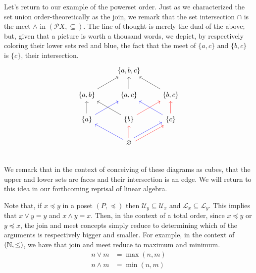 Let's return to our example of the powerset order. Just as we characterized the set union order-theoretically as the join, we remark that the set intersection $\cap$ is the meet $\wedge$ in $(\mathcal{P}X,\subseteq)$. The line of thought is merely the dual of the above; but, given that a picture is worth a thousand words, we depict, by respectively coloring their lower sets red and blue, the fact that the meet of $\{a,c\}$ and $\{b,c\}$ is $\{c\}$, their intersection.
\begin{equation}
\begin{tikzcd}
 & \{a,b,c\} & \\
 \{a,b\} \arrow[ur] & \{a,c\} \arrow[u]  & \{b,c\} \arrow[ul] \\
 \{a\} \arrow[u] \arrow[ur,blue] & \{b\} \arrow[ul] \arrow[ur,red] & \{c\} \arrow[u,red] \arrow[ul,blue] \\
 & \varnothing \arrow[ul,blue] \arrow[u,red] \arrow[ur,blue, shift left = 0.6 ex] \arrow[ur,red,shift right = 0.6 ex] & \\
\end{tikzcd}
\end{equation}
We remark that in the context of conceiving of these diagrams as cubes, that the upper and lower sets are faces and their intersection is an edge. We will return to this idea in our forthcoming reprisal of linear algebra.

Note that, if $x\preceq y$ in a poset $(P,\preceq)$ then $\mathcal{U}_y\subseteq\mathcal{U}_x$ and $\mathcal{L}_x\subseteq\mathcal{L}_y$. This implies that $x\vee y=y$ and $x\wedge y = x$. Then, in the context of a total order, since $x\preceq y$ or $y\preceq x$, the join and meet concepts simply reduce to determining which of the arguments is respectively bigger and smaller. For example, in the context of $(\mathbb N,\leq)$, we have that join and meet reduce to maximum and minimum.
\begin{align*}
    n\vee m &= \max(n,m)\\
    n\wedge m &= \min(n,m)
\end{align*}

